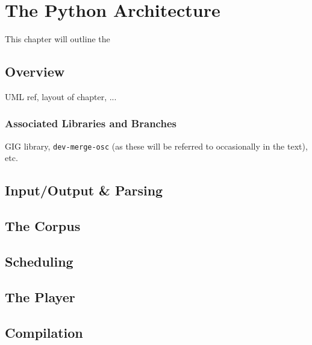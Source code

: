 \chapter{The Python Architecture}\label{sec:2-python-architecture}
This chapter will outline the 

\section{Overview}\label{ssec:2-overview}
UML ref, layout of chapter, ...

\subsection{Associated Libraries and Branches}\label{ssec:2-librarybranches}
GIG library, \texttt{dev-merge-osc} (as these will be referred to occasionally in the text), etc.



\section{Input/Output \& Parsing}\label{ssec:2-io-parsing}

\section{The Corpus}\label{ssec:2-corpus}

\section{Scheduling}\label{ssec:2-scheduling}

\section{The Player}\label{ssec:2-player}

\section{Compilation}\label{ssec:2-compilation}


